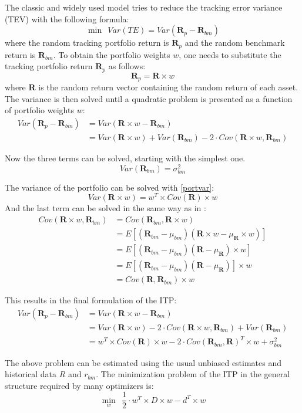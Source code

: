 \documentclass[
  oneside]{book}
\begin{document}
The classic and widely used model tries to reduce the tracking error variance (TEV) with the following formula:
\[
 \min \ \ Var(TE) = Var(\pmb{R}_{p}-\pmb{R}_{bm})
\]
where the random tracking portfolio return is \(\pmb{R}_{p}\) and the random benchmark return is \(\pmb{R}_{bm}\). To obtain the portfolio weights \(w\), one needs to substitute the tracking portfolio return \(\pmb{R}_{p}\) as follows:
\[
  \pmb{R}_{p} = \pmb{R} \times w
\]
where \(\pmb{R}\) is the random return vector containing the random return of each asset. The variance is then solved until a quadratic problem is presented as a function of portfolio weights \(w\):
\begin{align*}
 Var(\pmb{R}_{p}-\pmb{R}_{bm}) &= Var(\pmb{R} \times w - \pmb{R}_{bm}) \\
 &= Var(\pmb{R} \times w) + Var(\pmb{R}_{bm}) - 2 \cdot Cov(\pmb{R} \times w,\pmb{R}_{bm}) 
\end{align*}

Now the three terms can be solved, starting with the simplest one.
\[
Var(\pmb{R}_{bm}) = \sigma_{bm}^2
\]

The variance of the portfolio can be solved with \ref{portvar}:
\[
Var(\pmb{R} \times w) = w^T \times Cov(\pmb{R}) \times w
\]
And the last term can be solved in the same way as in \citep{Eric2021}:
\begin{align*}
  Cov(\pmb{R} \times w, \pmb{R}_{bm}) &= Cov(\pmb{R}_{bm}, \pmb{R} \times w) \\
  &= E[(\pmb{R}_{bm}-\mu_{bm})(\pmb{R} \times w-\mu_{\pmb{R}} \times w)] \\
  &= E[(\pmb{R}_{bm}-\mu_{bm})(\pmb{R}-\mu_{\pmb{R}}) \times w] \\
  &= E[(\pmb{R}_{bm}-\mu_{bm})(\pmb{R}-\mu_{\pmb{R}})] \times w \\
  &= Cov(\pmb{R},\pmb{R}_{bm}) \times w
\end{align*}

This results in the final formulation of the ITP:
\begin{align*}
  Var(\pmb{R}_{p}-\pmb{R}_{bm}) & = Var(\pmb{R} \times w - \pmb{R}_{bm}) \\
  & = Var(\pmb{R} \times w) - 2 \cdot Cov(\pmb{R} \times w,\pmb{R}_{bm}) + Var(\pmb{R}_{bm})  \\
  & = w^T \times Cov(\pmb{R}) \times w - 2 \cdot Cov(\pmb{R}_{bm}, \pmb{R})^T \times w + \sigma_{bm}^2
  \label{eq:ITP}
\end{align*}

The above problem can be estimated using the usual unbiased estimates and historical data \(R\) and \(r_{bm}\). The minimization problem of the ITP in the general structure required by many optimizers is:
\[
  \min\limits_{w} \ \ \frac{1}{2} \cdot w^T \times D \times w -d^T \times w
\]
\end{document}
